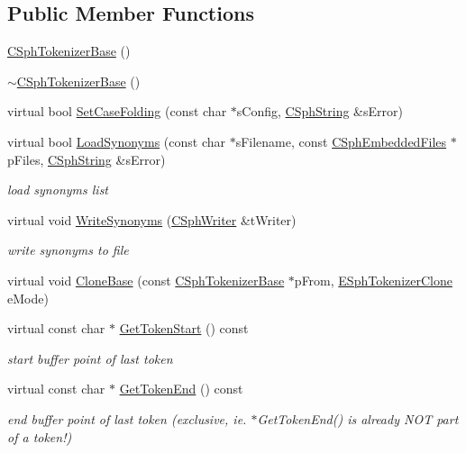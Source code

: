 \subsection*{Public Member Functions}
\begin{DoxyCompactItemize}
\item 
\hyperlink{classCSphTokenizerBase_a79e6f4390495b1b0594bc0f1232f2807}{C\-Sph\-Tokenizer\-Base} ()
\item 
\hyperlink{classCSphTokenizerBase_a9bc0e75903e1576e999d9d5167a6c27e}{$\sim$\-C\-Sph\-Tokenizer\-Base} ()
\item 
virtual bool \hyperlink{classCSphTokenizerBase_a295fa9b56b7fcda8300ba32510c7fc32}{Set\-Case\-Folding} (const char $\ast$s\-Config, \hyperlink{structCSphString}{C\-Sph\-String} \&s\-Error)
\item 
virtual bool \hyperlink{classCSphTokenizerBase_ac1713d598cc5ded62bd908cd4eedc9a7}{Load\-Synonyms} (const char $\ast$s\-Filename, const \hyperlink{structCSphEmbeddedFiles}{C\-Sph\-Embedded\-Files} $\ast$p\-Files, \hyperlink{structCSphString}{C\-Sph\-String} \&s\-Error)
\begin{DoxyCompactList}\small\item\em load synonyms list \end{DoxyCompactList}\item 
virtual void \hyperlink{classCSphTokenizerBase_ac477e10f7296f8cb050964e7f6ac49c1}{Write\-Synonyms} (\hyperlink{classCSphWriter}{C\-Sph\-Writer} \&t\-Writer)
\begin{DoxyCompactList}\small\item\em write synonyms to file \end{DoxyCompactList}\item 
virtual void \hyperlink{classCSphTokenizerBase_a8548d2f456d0fe635b3957bde8e3a508}{Clone\-Base} (const \hyperlink{classCSphTokenizerBase}{C\-Sph\-Tokenizer\-Base} $\ast$p\-From, \hyperlink{sphinx_8h_adc6a6e1ffce224f14950be604087978c}{E\-Sph\-Tokenizer\-Clone} e\-Mode)
\item 
virtual const char $\ast$ \hyperlink{classCSphTokenizerBase_a2da20b688e2cb8ce338e405c732807df}{Get\-Token\-Start} () const 
\begin{DoxyCompactList}\small\item\em start buffer point of last token \end{DoxyCompactList}\item 
virtual const char $\ast$ \hyperlink{classCSphTokenizerBase_a068f6b02cd7deb182dcc848fc74bbd90}{Get\-Token\-End} () const 
\begin{DoxyCompactList}\small\item\em end buffer point of last token (exclusive, ie. $\ast$\-Get\-Token\-End() is already N\-O\-T part of a token!) \end{DoxyCompactList}\item 

\end{DoxyCompactItemize}

